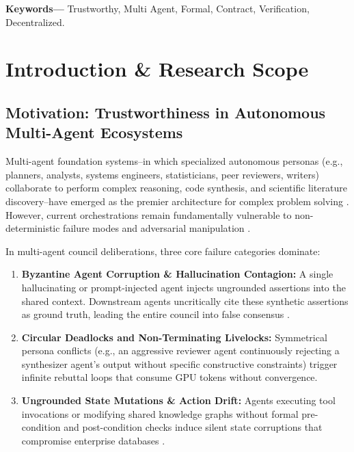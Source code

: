 \documentclass[10pt,journal,compsoc,twocolumn]{IEEEtran}
\begin{document}
\noindent\textbf{Keywords---} Trustworthy, Multi Agent, Formal, Contract, Verification, Decentralized.







\section{Introduction \& Research Scope}



\subsection{Motivation: Trustworthiness in Autonomous Multi-Agent Ecosystems}


Multi-agent foundation systems--in which specialized autonomous personas (e.g., planners, analysts, systems engineers, statisticians, peer reviewers, writers) collaborate to perform complex reasoning, code synthesis, and scientific literature discovery--have emerged as the premier architecture for complex problem solving \cite{arxiv_2005_14165,arxiv_2405_01543}. However, current orchestrations remain fundamentally vulnerable to non-deterministic failure modes and adversarial manipulation \cite{arxiv_2312_03893}.

In multi-agent council deliberations, three core failure categories dominate:
\begin{enumerate}
  \item \textbf{Byzantine Agent Corruption \& Hallucination Contagion:} A single hallucinating or prompt-injected agent injects ungrounded assertions into the shared context. Downstream agents uncritically cite these synthetic assertions as ground truth, leading the entire council into false consensus \cite{arxiv_2406_00584}.
  \item \textbf{Circular Deadlocks and Non-Terminating Livelocks:} Symmetrical persona conflicts (e.g., an aggressive reviewer agent continuously rejecting a synthesizer agent's output without specific constructive constraints) trigger infinite rebuttal loops that consume GPU tokens without convergence.
  \item \textbf{Ungrounded State Mutations \& Action Drift:} Agents executing tool invocations or modifying shared knowledge graphs without formal pre-condition and post-condition checks induce silent state corruptions that compromise enterprise databases \cite{arxiv_2404_04289}.
\end{enumerate}
\end{document}

